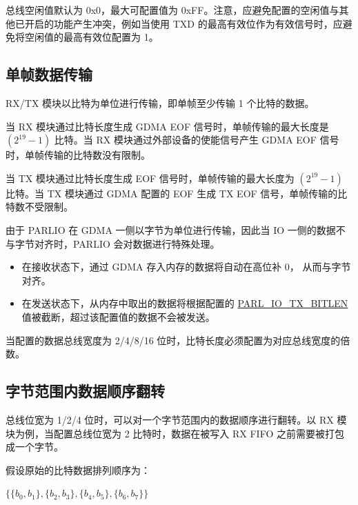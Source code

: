\documentclass[main\_\_CN.tex]{subfiles}
\begin{document}
总线空闲值默认为 0x0，最大可配置值为 0xFF。注意，应避免配置的空闲值与其他已开启的功能产生冲突，例如当使用 TXD 的最高有效位作为有效信号时，应避免将空闲值的最高有效位配置为 1。

\subsection{单帧数据传输}

RX/TX 模块以比特为单位进行传输，即单帧至少传输 1 个比特的数据。

当 RX 模块通过比特长度生成 GDMA EOF 信号时，单帧传输的最大长度是 \begin{math} (2^{19}-1) \end{math} 比特。当 RX 模块通过外部设备的使能信号产生 GDMA EOF 信号时，单帧传输的比特数没有限制。

当 TX 模块通过比特长度生成 EOF 信号时，单帧传输的最大长度为 \begin{math} (2^{19}-1) \end{math} 比特。当 TX 模块通过 GDMA 配置的 EOF 生成 TX EOF 信号，单帧传输的比特数不受限制。

由于 PARLIO 在 GDMA 一侧以字节为单位进行传输，因此当 IO 一侧的数据不与字节对齐时，PARLIO 会对数据进行特殊处理。

\begin{itemize}
    \item 在接收状态下，通过 GDMA 存入内存的数据将自动在高位补 0， 从而与字节对齐。
    \item 在发送状态下，从内存中取出的数据将根据配置的 \hyperref[fielddesc:PARLIOTXBITLEN]{PARL\_IO\_TX\_BITLEN} 值被截断，超过该配置值的数据不会被发送。
\end{itemize}

当配置的数据总线宽度为 2/4/8/16 位时，比特长度必须配置为对应总线宽度的倍数。


\subsection{字节范围内数据顺序翻转}

总线位宽为 1/2/4 位时，可以对一个字节范围内的数据顺序进行翻转。以 RX 模块为例，当配置总线位宽为 2 比特时，数据在被写入 RX FIFO 之前需要被打包成一个字节。

假设原始的比特数据排列顺序为：

\begin{center}
$\{ \{ b_{0}, b_{1} \}, \{ b_{2}, b_{3} \}, \{ b_{4}, b_{5} \}, \{ b_{6}, b_{7} \} \}$
\end{center}
\end{document}
